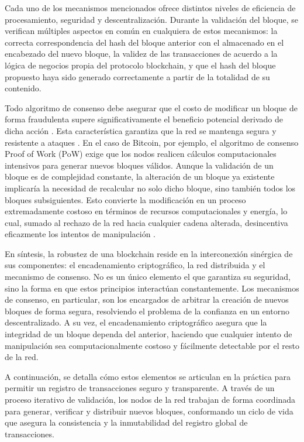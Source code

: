 Cada uno de los mecanismos mencionados ofrece distintos niveles de eficiencia de procesamiento, seguridad y descentralización. Durante la validación del bloque, se verifican múltiples aspectos en común en cualquiera de estos mecanismos: la correcta correspondencia del hash del bloque anterior con el almacenado en el encabezado del nuevo bloque, la validez de las transacciones de acuerdo a la lógica de negocios propia del protocolo blockchain, y que el hash del bloque propuesto haya sido generado correctamente a partir de la totalidad de su contenido.

Todo algoritmo de consenso debe asegurar que el costo de modificar un bloque de forma fraudulenta supere significativamente el beneficio potencial derivado de dicha acción \cite{satoshi2008bitcoin}. Esta característica garantiza que la red se mantenga segura y resistente a ataques \cite{buterin2013ethereum}. En el caso de Bitcoin, por ejemplo, el algoritmo de consenso Proof of Work (PoW) exige que los nodos realicen cálculos computacionales intensivos para generar nuevos bloques válidos. Aunque la validación de un bloque es de complejidad constante, la alteración de un bloque ya existente implicaría la necesidad de recalcular no solo dicho bloque, sino también todos los bloques subsiguientes. Esto convierte la modificación en un proceso extremadamente costoso en términos de recursos computacionales y energía, lo cual, sumado al rechazo de la red hacia cualquier cadena alterada, desincentiva eficazmente los intentos de manipulación \cite{satoshi2008bitcoin}.

En síntesis, la robustez de una blockchain reside en la interconexión sinérgica de sus componentes: el encadenamiento criptográfico, la red distribuida y el mecanismo de consenso. No es un único elemento el que garantiza su seguridad, sino la forma en que estos principios interactúan constantemente. Los mecanismos de consenso, en particular, son los encargados de arbitrar la creación de nuevos bloques de forma segura, resolviendo el problema de la confianza en un entorno descentralizado. A su vez, el encadenamiento criptográfico asegura que la integridad de un bloque dependa del anterior, haciendo que cualquier intento de manipulación sea computacionalmente costoso y fácilmente detectable por el resto de la red.

A continuación, se detalla cómo estos elementos se articulan en la práctica para permitir un registro de transacciones seguro y transparente. A través de un proceso iterativo de validación, los nodos de la red trabajan de forma coordinada para generar, verificar y distribuir nuevos bloques, conformando un ciclo de vida que asegura la consistencia y la inmutabilidad del registro global de transacciones.

